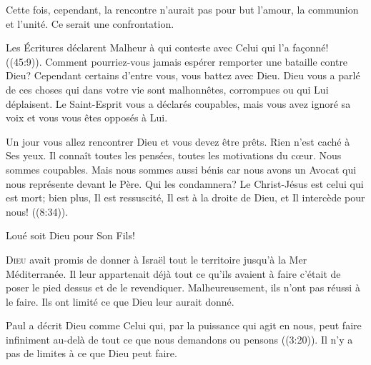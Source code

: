 Cette fois, cependant, la rencontre n'aurait pas pour but l'amour,
 la communion et l'unité. Ce serait une confrontation. 


Les Écritures déclarent\frcolon{} 
 \Og Malheur à qui conteste avec Celui qui l'a fa\c{c}onné! \Fg{}
 ((45:9)).
 Comment pourriez-vous jamais espérer remporter une bataille contre Dieu?
 Cependant certains d'entre vous, vous battez avec Dieu.
 Dieu vous a parlé de ces choses qui dans votre vie sont malhonnêtes,
 corrompues ou qui Lui déplaisent. Le Saint-Esprit vous a déclarés coupables,
 mais vous avez ignoré sa voix et vous vous êtes opposés à Lui. 

Un jour vous allez rencontrer Dieu et vous devez être prêts.
 Rien n'est caché à Ses yeux. Il connaît toutes les pensées,
 toutes les motivations du c\oe{}ur. Nous sommes coupables.
 Mais nous sommes aussi bénis \ocadr car nous avons un Avocat qui nous
 représente devant le Père.
 \Og Qui les condamnera? Le Christ-Jésus est celui qui est mort;
 bien plus, Il est ressuscité, Il est à la droite de Dieu,
 et Il intercède pour nous! \Fg{} ((8:34)). 

Loué soit Dieu pour Son Fils! 

\dvrule






\lettrine{D}{ieu} avait promis de donner à Israël tout le territoire
 jusqu'à la Mer Méditerranée. Il leur appartenait déjà
 \ocadr tout ce qu'ils avaient à faire c'était de poser le pied dessus
 et de le revendiquer. Malheureusement, ils n'ont pas réussi à le faire.
 Ils ont limité ce que Dieu leur aurait donné. 

Paul a décrit Dieu comme \Og Celui qui, par la puissance qui agit en nous,
 peut faire infiniment au-delà de tout ce que nous demandons ou pensons \Fg{}
 ((3:20)). Il n'y a pas de limites à ce que Dieu peut faire. 

